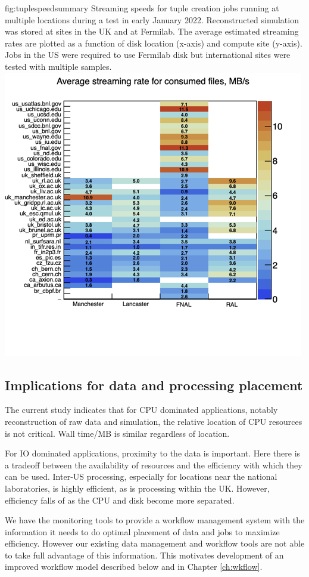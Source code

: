 \documentclass[../main-v1.tex]{subfiles}
\begin{document}
\begin{dunefigure}
{fig:tuplespeedsummary} 
{Streaming speeds for tuple creation jobs running at multiple locations during a test in early January 2022. Reconstructed simulation was stored at sites in the UK and at Fermilab.  The average estimated streaming rates are plotted as a function of disk location (x-axis) and compute site (y-axis). Jobs in the US were required to use Fermilab disk but international sites were tested with multiple samples.}
\includegraphics[width=0.8 \textwidth]{graphics/Workflow/fastRates.png}
\end{dunefigure}

\subsection{Implications for data and processing placement}

The current study indicates that for CPU dominated applications, notably reconstruction of raw data and simulation, the relative location of CPU resources is not critical. Wall time/MB   is similar regardless of location. 

For IO dominated applications, proximity to the data is important.  Here there is a tradeoff between the availability of resources and the efficiency with which they can be used. Inter-US processing, especially for locations near the national laboratories, is highly efficient, as is processing within the UK.  However, efficiency falls of as the CPU and disk become more separated.  

We have the monitoring tools to provide a workflow management system with the information it needs to do optimal placement of data and jobs to maximize efficiency. However our existing data management and workflow tools are not able to take full advantage of this information.  This motivates development of an improved workflow model described below and in Chapter \ref{ch:wkflow}.
\end{document}
